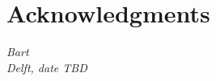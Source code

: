 \chapter*{Acknowledgments}

\todo{}

\begin{flushright}
{\itshape
Bart \\
Delft, date TBD
}
\end{flushright}
